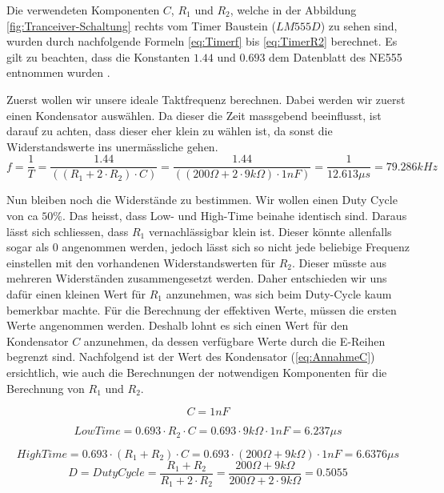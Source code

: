 Die verwendeten Komponenten $C$, $R_{1}$ und $R_{2}$, welche in der Abbildung  \ref{fig:Tranceiver-Schaltung} rechts vom Timer Baustein ($LM555D$) zu sehen sind, wurden durch nachfolgende Formeln \ref{eq:Timerf} bis \ref{eq:TimerR2} berechnet. Es gilt zu beachten, dass die Konstanten $1.44$ und $0.693$ dem Datenblatt des NE555 entnommen wurden \cite{Timerbaustein}.


Zuerst wollen wir unsere ideale Taktfrequenz berechnen. Dabei werden wir zuerst einen Kondensator auswählen. Da dieser die Zeit massgebend beeinflusst, ist darauf zu achten, dass dieser eher klein zu wählen ist, da sonst die Widerstandswerte ins unermässliche gehen.
\begin{equation}\label{eq:Timerf}
f= \dfrac{1}{T}= \dfrac{1.44}{((R_{1} + 2 \cdot R_{2})\cdot C)} = \dfrac{1.44}{((200\Omega + 2 \cdot 9k\Omega)\cdot 1nF)}=\dfrac{1}{12.613\mu s} = 79.286kHz
\end{equation}

Nun bleiben noch die Widerstände zu bestimmen. Wir wollen einen Duty Cycle von ca $50\%$. Das heisst, dass Low- und High-Time beinahe identisch sind. Daraus lässt sich schliessen, dass $R_{1}$ vernachlässigbar klein ist. Dieser könnte allenfalls sogar als $0$ angenommen werden, jedoch lässt sich so nicht jede beliebige Frequenz einstellen mit den vorhandenen Widerstandswerten für $R_{2}$. Dieser müsste aus mehreren Widerständen zusammengesetzt werden. Daher entschieden wir uns dafür einen kleinen Wert für $R_{1}$ anzunehmen, was sich beim Duty-Cycle kaum bemerkbar machte. Für die Berechnung der effektiven Werte, müssen die ersten Werte angenommen werden. Deshalb lohnt es sich einen Wert für den Kondensator $C$ anzunehmen, da dessen verfügbare Werte durch die E-Reihen begrenzt sind. Nachfolgend ist der Wert des Kondensator (\ref{eq:AnnahmeC}) ersichtlich, wie auch die Berechnungen der notwendigen Komponenten für die Berechnung von $R_{1}$ und $R_{2}$.

\begin{equation}\label{eq:AnnahmeC}
C= 1nF
\end{equation}

\begin{equation}\label{eq:TimerT}
LowTime= 0.693 \cdot R_{2} \cdot C = 0.693 \cdot 9k\Omega \cdot 1nF = 6.237\mu s
\end{equation}

\begin{equation}\label{eq:TimerTH}
HighTime= 0.693 \cdot (R_{1} + R_{2}) \cdot C = 0.693 \cdot (200\Omega + 9k\Omega) \cdot 1nF = 6.6376\mu s
\end{equation}
\begin{equation}\label{eq:TimerDC}
D = DutyCycle = \dfrac{R_{1} + R_{2}}{R_{1} + 2 \cdot R_{2}} = \dfrac{200\Omega + 9k\Omega}{200\Omega + 2 \cdot 9k\Omega} = 0.5055
\end{equation}

